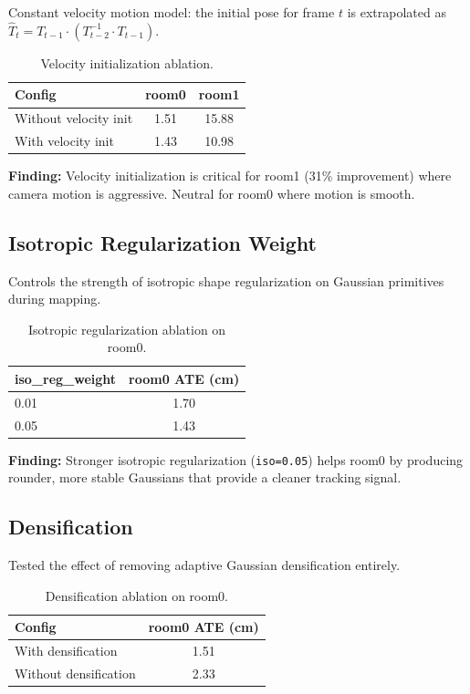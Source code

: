 \documentclass[10pt,twocolumn]{article}
\begin{document}
Constant velocity motion model: the initial pose for frame $t$ is extrapolated as $\hat{T}_t = T_{t-1} \cdot (T_{t-2}^{-1} \cdot T_{t-1})$.

\begin{table}[h]
\centering
\caption{Velocity initialization ablation.}
\label{tab:velocity}
\begin{tabular}{lcc}
\toprule
\textbf{Config} & \textbf{room0} & \textbf{room1} \\
\midrule
Without velocity init & 1.51 & 15.88 \\
With velocity init & 1.43 & 10.98 \\
\bottomrule
\end{tabular}
\end{table}

\textbf{Finding:} Velocity initialization is critical for room1 (31\% improvement) where camera motion is aggressive. Neutral for room0 where motion is smooth.

\subsection{Isotropic Regularization Weight}

Controls the strength of isotropic shape regularization on Gaussian primitives during mapping.

\begin{table}[h]
\centering
\caption{Isotropic regularization ablation on room0.}
\label{tab:iso}
\begin{tabular}{lc}
\toprule
\textbf{iso\_reg\_weight} & \textbf{room0 ATE (cm)} \\
\midrule
0.01 & 1.70 \\
0.05 & 1.43 \\
\bottomrule
\end{tabular}
\end{table}

\textbf{Finding:} Stronger isotropic regularization (\texttt{iso=0.05}) helps room0 by producing rounder, more stable Gaussians that provide a cleaner tracking signal.

\subsection{Densification}

Tested the effect of removing adaptive Gaussian densification entirely.

\begin{table}[h]
\centering
\caption{Densification ablation on room0.}
\label{tab:densify}
\begin{tabular}{lc}
\toprule
\textbf{Config} & \textbf{room0 ATE (cm)} \\
\midrule
With densification & 1.51 \\
Without densification & 2.33 \\
\bottomrule
\end{tabular}
\end{table}
\end{document}

